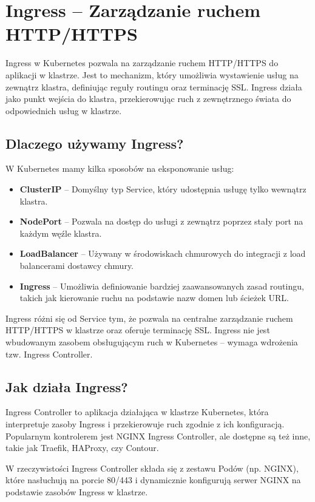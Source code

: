 \documentclass{article}
\begin{document}
\section{Ingress – Zarządzanie ruchem HTTP/HTTPS}

Ingress w Kubernetes pozwala na zarządzanie ruchem HTTP/HTTPS do aplikacji w klastrze. Jest to mechanizm, który umożliwia wystawienie usług na zewnątrz klastra, definiując reguły routingu oraz terminację SSL. Ingress działa jako punkt wejścia do klastra, przekierowując ruch z zewnętrznego świata do odpowiednich usług w klastrze.

\subsection{Dlaczego używamy Ingress?}
W Kubernetes mamy kilka sposobów na eksponowanie usług:
\begin{itemize}
    \item \textbf{ClusterIP} – Domyślny typ Service, który udostępnia usługę tylko wewnątrz klastra.
    \item \textbf{NodePort} – Pozwala na dostęp do usługi z zewnątrz poprzez stały port na każdym węźle klastra.
    \item \textbf{LoadBalancer} – Używany w środowiskach chmurowych do integracji z load balancerami dostawcy chmury.
    \item \textbf{Ingress} – Umożliwia definiowanie bardziej zaawansowanych zasad routingu, takich jak kierowanie ruchu na podstawie nazw domen lub ścieżek URL.
\end{itemize}

Ingress różni się od Service tym, że pozwala na centralne zarządzanie ruchem HTTP/HTTPS w klastrze oraz oferuje terminację SSL. Ingress nie jest wbudowanym zasobem obsługującym ruch w Kubernetes – wymaga wdrożenia tzw. Ingress Controller.

\subsection{Jak działa Ingress?}
Ingress Controller to aplikacja działająca w klastrze Kubernetes, która interpretuje zasoby Ingress i przekierowuje ruch zgodnie z ich konfiguracją. Popularnym kontrolerem jest NGINX Ingress Controller, ale dostępne są też inne, takie jak Traefik, HAProxy, czy Contour.

W rzeczywistości Ingress Controller składa się z zestawu Podów (np. NGINX), które nasłuchują na porcie 80/443 i dynamicznie konfigurują serwer NGINX na podstawie zasobów Ingress w klastrze.
\end{document}
